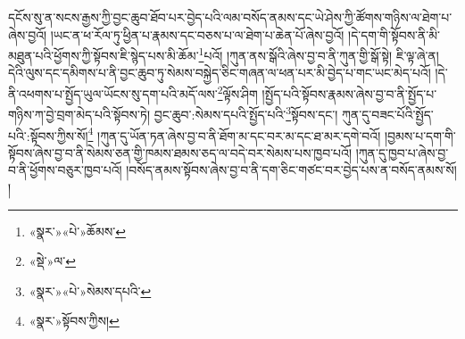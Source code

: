 དངོས་སུ་ན་སངས་རྒྱས་ཀྱི་བྱང་ཆུབ་ཐོབ་པར་བྱེད་པའི་ལམ་བསོད་ནམས་དང་ཡེ་ཤེས་ཀྱི་ཚོགས་གཉིས་ལ་ཐེག་པ་ཞེས་བྱའོ། །ཡང་ན་ཕ་རོལ་ཏུ་ཕྱིན་པ་རྣམས་དང་བཅས་པ་ལ་ཐེག་པ་ཆེན་པོ་ཞེས་བྱའོ། །དེ་དག་གི་སྟོབས་ནི་མི་མཐུན་པའི་ཕྱོགས་ཀྱི་སྟོབས་ཇི་སྙེད་པས་མི་ཆོམ་\footnote{«སྣར་»«པེ་»ཆོམས་}པའོ། །ཀུན་ནས་སྒོའི་ཞེས་བྱ་བ་ནི་ཀུན་གྱི་སྒོ་སྟེ། ཇི་ལྟ་ཞེ་ན། དེའི་ལུས་དང་དམིགས་པ་ནི་བྱང་ཆུབ་ཏུ་སེམས་བསྐྱེད་ཅིང་གཞན་ལ་ཕན་པར་མི་བྱེད་པ་གང་ཡང་མེད་པའོ། །དེ་ནི་འཕགས་པ་སྤྱོད་ཡུལ་ཡོངས་སུ་དག་པའི་མདོ་ལས་\footnote{«སྡེ་»ལ་}ལྟོས་ཤིག །སྤྱོད་པའི་སྟོབས་རྣམས་ཞེས་བྱ་བ་ནི་སྤྱོད་པ་གཉིས་ཀ་བྱེ་བྲག་མེད་པའི་སྟོབས་ཏེ། བྱང་ཆུབ་:སེམས་དཔའི་སྤྱོད་པའི་\footnote{«སྣར་»«པེ་»སེམས་དཔའི་}སྟོབས་དང་། ཀུན་དུ་བཟང་པོའི་སྤྱོད་པའི་:སྟོབས་ཀྱིས་སོ།\footnote{«སྣར་»སྟོབས་ཀྱིས།} །ཀུན་དུ་ཡོན་ཏན་ཞེས་བྱ་བ་ནི་ཐོག་མ་དང་བར་མ་དང་ཐ་མར་དགེ་བའོ། །བྱམས་པ་དག་གི་སྟོབས་ཞེས་བྱ་བ་ནི་སེམས་ཅན་གྱི་ཁམས་ཐམས་ཅད་ལ་བདེ་བར་སེམས་པས་ཁྱབ་པའོ། །ཀུན་དུ་ཁྱབ་པ་ཞེས་བྱ་བ་ནི་ཕྱོགས་བཅུར་ཁྱབ་པའོ། །བསོད་ནམས་སྟོབས་ཞེས་བྱ་བ་ནི་དག་ཅིང་གཙང་བར་བྱེད་པས་ན་བསོད་ནམས་སོ། །
